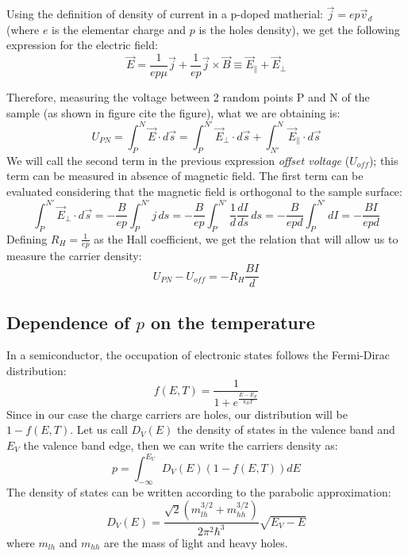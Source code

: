 \documentclass[11pt,a4paper]{article}
\begin{document}
Using the definition of density of current in a p-doped matherial: $\vec{j}=ep\vec{v}_d$ (where $e$ is the elementar charge and $p$ is the holes density), we get the following expression for the electric field:
\begin{equation}
\vec{E}=\frac{1}{ep\mu}\vec{j}+\frac{1}{ep}\vec{j}\times\vec{B}\equiv \vec{E}_\parallel+\vec{E}_\perp
\end{equation}

Therefore, measuring the voltage between 2 random points P and N of the sample (as shown in figure {\tiny cite the figure}), what we are obtaining is:
\begin{equation}
U_{PN}=\int_P^N\vec{E}\cdot d\vec{s}=\int_P^{N'}\vec{E}_\perp\cdot d\vec{s}+\int_{N'}^N\vec{E}_\parallel\cdot d\vec{s}
\end{equation}
We will call the second term in the previous expression \emph{offset voltage} ($U_{off}$); this term can be measured in absence of magnetic field. The first term can be evaluated considering that the magnetic field is orthogonal to the sample surface:
\begin{equation}
\int_P^{N'}\vec{E}_\perp\cdot d\vec{s}=-\frac{B}{ep}\int_P^{N'}j\, ds=-\frac{B}{ep}\int_P^{N'}\frac{1}{d}\frac{dI}{ds}\, ds=-\frac{B}{epd}\int_P^{N'} dI=-\frac{BI}{epd}
\end{equation}
Defining $R_H=\frac{1}{ep}$ as the Hall coefficient, we get the relation that will allow us to measure the carrier density:
\begin{equation}
U_{PN}-U_{off}=-R_H\frac{BI}{d}
\end{equation}
\subsection{Dependence of $p$ on the temperature}
In a semiconductor, the occupation of electronic states follows the Fermi-Dirac distribution:
\begin{equation*}
f(E,T)=\frac{1}{1+e^{\frac{E-E_F}{k_BT}}}
\end{equation*}
Since in our case the charge carriers are holes, our distribution will be $1-f(E,T)$. Let us call $D_V(E)$ the density of states in the valence band and $E_V$ the valence band edge, then we can write the carriers density as:
\begin{equation}
p=\int_{-\infty}^{E_V}D_V(E)(1-f(E,T))dE
\end{equation}
The density of states can be written according to the parabolic approximation:
\begin{equation*}
D_V(E)=\frac{\sqrt{2}(m_{lh}^{3/2}+m_{hh}^{3/2})}{2\pi^2\hbar^3}\sqrt{E_V-E}
\end{equation*} where $m_{lh}$ and $m_{hh}$ are the mass of light and heavy holes.
\end{document}
